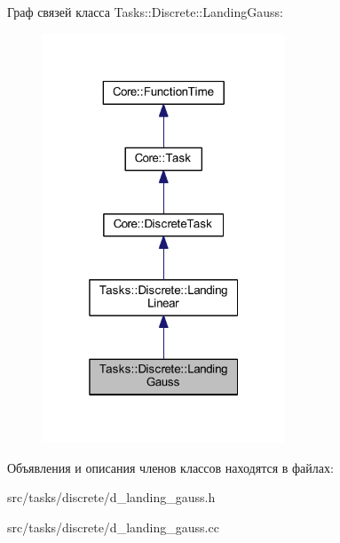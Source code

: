 Граф связей класса Tasks\+:\+:Discrete\+:\+:Landing\+Gauss\+:
\nopagebreak
\begin{figure}[H]
\begin{center}
\leavevmode
\includegraphics[width=205pt]{class_tasks_1_1_discrete_1_1_landing_gauss__coll__graph}
\end{center}
\end{figure}


Объявления и описания членов классов находятся в файлах\+:\begin{DoxyCompactItemize}
\item 
src/tasks/discrete/d\+\_\+landing\+\_\+gauss.\+h\item 
src/tasks/discrete/d\+\_\+landing\+\_\+gauss.\+cc\end{DoxyCompactItemize}
